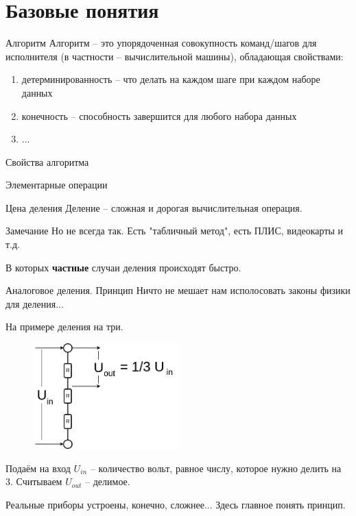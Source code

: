 \section{Базовые понятия}\label{section:base_alg}

\begin{frame}{Алгоритм}
Алгоритм -- это упорядоченная совокупность команд/шагов
для исполнителя (в частности -- вычислительной машины),
обладающая свойствами:
\begin{enumerate}
	\item детерминированность -- что делать на каждом шаге при каждом наборе данных
	\item конечность -- способность завершится для любого набора данных
	\item ... %
\end{enumerate}
 
Свойства алгоритма	
\end{frame}

\begin{frame}{Элементарные операции}
	
\end{frame}

\begin{frame}{Цена деления}
Деление -- сложная и дорогая вычислительная операция.
	
	\begin{block}{Замечание}
	Но не всегда так. 
	Есть "табличный метод",
	есть ПЛИС, видеокарты и т.д.
	
	В которых \textbf{частные} случаи деления происходят быстро.
	\end{block}

\end{frame}

\begin{frame}{Аналоговое деления. Принцип}
 	Ничто не мешает нам исполосовать законы физики для деления...
 	
 	На примере деления на три.
 	
 	\begin{figure}
 		\centering
 		\includegraphics[width=0.5\textwidth]{./../pic/U_division.drawio.png}
 	\end{figure}
 	Подаём на вход $U_{in}$ -- количество вольт, равное числу, которое нужно делить на 3.
 	Считываем $U_{out}$ -- делимое.
 	
 	Реальные приборы устроены, конечно, сложнее... Здесь главное понять принцип.


\end{frame}






